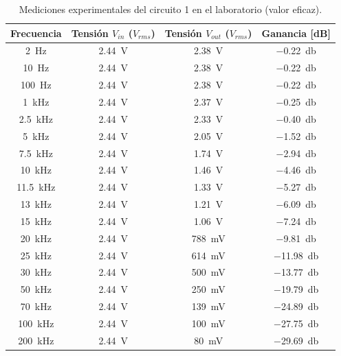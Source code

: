 \begin{table}[H]
  \centering
  \begin{tabular}{cccc}
    \hline
    \textbf{Frecuencia} & \textbf{Tensión $V_{in}$ ($V_{rms}$)} & \textbf{Tensión $V_{out}$ ($V_{rms}$)} & \textbf{Ganancia [dB]} \\
    \hline
    \SI{2}{\hertz}         & \SI{2.44}{\volt}   & \SI{2.38}{\volt}          & \SI{-0.22}{\decibel} \\
    \SI{10}{\hertz}        & \SI{2.44}{\volt}   & \SI{2.38}{\volt}          & \SI{-0.22}{\decibel} \\
    \SI{100}{\hertz}       & \SI{2.44}{\volt}   & \SI{2.38}{\volt}          & \SI{-0.22}{\decibel} \\
    \SI{1}{\kilo\hertz}    & \SI{2.44}{\volt}   & \SI{2.37}{\volt}          & \SI{-0.25}{\decibel} \\
    \SI{2.5}{\kilo\hertz}  & \SI{2.44}{\volt}   & \SI{2.33}{\volt}          & \SI{-0.40}{\decibel} \\
    \SI{5}{\kilo\hertz}    & \SI{2.44}{\volt}   & \SI{2.05}{\volt}          & \SI{-1.52}{\decibel} \\
    \SI{7.5}{\kilo\hertz}  & \SI{2.44}{\volt}   & \SI{1.74}{\volt}          & \SI{-2.94}{\decibel} \\
    \SI{10}{\kilo\hertz}   & \SI{2.44}{\volt}   & \SI{1.46}{\volt}          & \SI{-4.46}{\decibel} \\
    \SI{11.5}{\kilo\hertz} & \SI{2.44}{\volt}   & \SI{1.33}{\volt}          & \SI{-5.27}{\decibel} \\
    \SI{13}{\kilo\hertz}   & \SI{2.44}{\volt}   & \SI{1.21}{\volt}          & \SI{-6.09}{\decibel} \\
    \SI{15}{\kilo\hertz}   & \SI{2.44}{\volt}   & \SI{1.06}{\volt}          & \SI{-7.24}{\decibel} \\
    \SI{20}{\kilo\hertz}   & \SI{2.44}{\volt}   & \SI{788}{\milli\volt}     & \SI{-9.81}{\decibel} \\
    \SI{25}{\kilo\hertz}   & \SI{2.44}{\volt}   & \SI{614}{\milli\volt}     & \SI{-11.98}{\decibel} \\
    \SI{30}{\kilo\hertz}   & \SI{2.44}{\volt}   & \SI{500}{\milli\volt}     & \SI{-13.77}{\decibel} \\
    \SI{50}{\kilo\hertz}   & \SI{2.44}{\volt}   & \SI{250}{\milli\volt}     & \SI{-19.79}{\decibel} \\
    \SI{70}{\kilo\hertz}   & \SI{2.44}{\volt}   & \SI{139}{\milli\volt}     & \SI{-24.89}{\decibel} \\
    \SI{100}{\kilo\hertz}  & \SI{2.44}{\volt}   & \SI{100}{\milli\volt}     & \SI{-27.75}{\decibel} \\
    \SI{200}{\kilo\hertz}  & \SI{2.44}{\volt}   & \SI{80}{\milli\volt}      & \SI{-29.69}{\decibel} \\
    \hline
  \end{tabular}
  \caption{Mediciones experimentales del circuito 1 en el laboratorio (valor eficaz).}
  \label{tab:mediciones_circuito_1}
\end{table}


